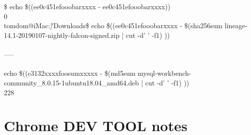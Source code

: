 \documentclass[10pt,a4paper]{article}
\begin{document}
{\large \\
\\
\$ echo \$((ee0c451efooobarxxxx - ee0c451efooobarxxxx))\\
0\\
tomdom@iMac:\~/Downloads\$ echo \$((ee0c451efooobarxxxx - \$(sha256sum lineage-14.1-20190107-nightly-falcon-signed.zip | cut -d' ' -f1) ))\\
\\
-----\\
\\
echo \$((c3132xxxxfoosumxxxxx - \$(md5sum mysql-workbench-community\_8.0.15-1ubuntu18.04\_amd64.deb | cut -d' ' -f1) ))\\
}228
\hypertarget{chrome_dev_tool_notes}{\section {Chrome DEV TOOL notes}}
\end{document}
